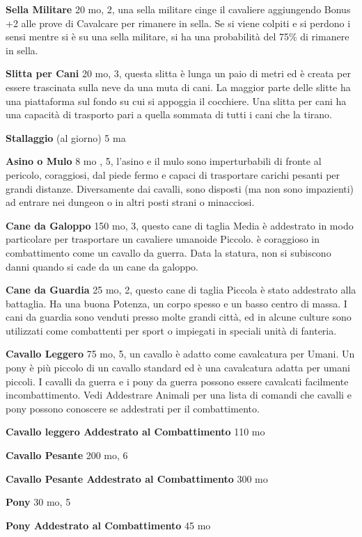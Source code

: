 \documentclass[a4paper,11pt,twoside,openany]{book}
\begin{document}
{\textbf{Sella Militare} 20 mo, 2, una sella militare cinge il cavaliere aggiungendo Bonus +2 alle prove di Cavalcare per rimanere in sella. Se si viene colpiti e si perdono i sensi mentre si è su una sella militare, si ha una probabilità del 75\% di rimanere in sella.

\textbf{Slitta per Cani} 20 mo, 3, questa slitta è lunga un paio di metri ed è creata per essere trascinata sulla neve da una muta di cani. La maggior parte delle slitte ha una piattaforma sul fondo su cui si appoggia il cocchiere.
Una slitta per cani ha una capacità di trasporto pari a quella sommata di tutti i cani che la tirano.

\textbf{Stallaggio} (al giorno) 5 ma 

\textbf{Asino o Mulo} 8 mo , 5, l'asino e il mulo sono imperturbabili di fronte al pericolo, coraggiosi, dal piede fermo e capaci di trasportare carichi pesanti per grandi distanze. Diversamente dai cavalli, sono disposti (ma non sono impazienti) ad entrare nei dungeon o in altri posti strani o minacciosi.

\textbf{Cane da Galoppo} 150 mo, 3, questo cane di taglia Media è addestrato in modo particolare per trasportare un cavaliere umanoide Piccolo. è coraggioso in combattimento come un cavallo da guerra. Data la statura, non si subiscono danni quando si cade da un cane da galoppo.

\textbf{Cane da Guardia} 25 mo, 2, questo cane di taglia Piccola è stato addestrato alla battaglia. Ha una buona Potenza, un corpo spesso e un basso centro di massa. I cani da guardia sono venduti presso molte grandi città, ed in alcune culture sono utilizzati come combattenti per sport o impiegati in speciali unità di fanteria.

\textbf{Cavallo Leggero} 75 mo, 5, un cavallo è adatto come cavalcatura per Umani. Un pony è più piccolo di un cavallo standard ed è una cavalcatura adatta per umani piccoli. I cavalli da guerra e i pony da guerra possono essere cavalcati facilmente incombattimento.
Vedi Addestrare Animali per una lista di comandi che cavalli e pony possono conoscere se addestrati per il combattimento.

\textbf{Cavallo leggero Addestrato al Combattimento} 110 mo

\textbf{Cavallo Pesante} 200 mo, 6

\textbf{Cavallo Pesante Addestrato al Combattimento} 300 mo

\textbf{Pony} 30 mo, 5

\textbf{Pony Addestrato al Combattimento} 45 mo

}
\end{document}
